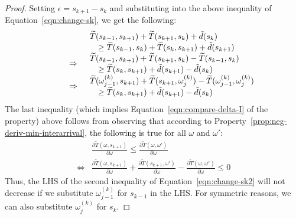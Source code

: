 \begin{proof}
\noindent Setting $\epsilon = s_{k+1} - s_k$ and substituting into the above inequality of Equation~\ref{eqn:change-sk}, we get the following:
\begin{equation}\label{eqn:change-sk2}
\begin{array}{ll}
     &\begin{array}{ll}
        \lefteqn{\widetilde{T}(s_{k-1},s_{k+1}) + \widetilde{T}(s_{k+1}, s_k) + \tilde{d}(s_k)}& \\
        &\geq \widetilde{T}(s_{k-1},s_k) + \widetilde{T}(s_k, s_{k+1}) + \tilde{d}(s_{k+1}) 
    \end{array}\\
    \Rightarrow&
    \begin{array}{ll}
        \lefteqn{\widetilde{T}(s_{k-1},s_{k+1}) + \widetilde{T}(s_{k+1}, s_k) - \widetilde{T}(s_{k-1},s_k)}& \\
        &\geq \widetilde{T}(s_k, s_{k+1}) + \tilde{d}(s_{k+1}) - \tilde{d}(s_k)
    \end{array}\\
    \Rightarrow&
    \begin{array}{ll}
        \lefteqn{\widetilde{T}(\omega^{(k)}_{j-1}, s_{k+1}) + \widetilde{T}(s_{k+1},\omega^{(k)}_{j}) - \widetilde{T}(\omega^{(k)}_{j-1},\omega^{(k)}_{j})} &\\
        &\geq \widetilde{T}(s_k, s_{k+1}) + \tilde{d}(s_{k+1}) - \tilde{d}(s_k) \\
    \end{array}\\
\end{array}
\end{equation}
\noindent The last inequality (which implies Equation~\ref{eqn:compare-delta-I} of the property) above follows from observing that according to Property~\ref{prop:neg-deriv-min-interarrival}, the following is true for all $\omega$ and $\omega'$:
\begin{equation}
\begin{array}{ll}
        &\frac{\partial \widetilde{T}(\omega,s_{k+1})}{\partial \omega}
            \leq \frac{\partial \widetilde{T}(\omega,\omega')}{\partial \omega} \nonumber\\
        \Leftrightarrow&
        \frac{\partial \widetilde{T}(\omega,s_{k+1})}{\partial \omega} + \frac{\partial \widetilde{T}(s_{k+1},\omega')}{\partial \omega} - \frac{\partial \widetilde{T}(\omega,\omega')}{\partial \omega} \leq 0 \nonumber  
\end{array}
\end{equation}
\noindent  Thus, the LHS of the second inequality of Equation~\ref{eqn:change-sk2} will not decrease if we substitute $\omega^{(k)}_{j-1}$ for $s_{k-1}$ in the LHS.  For symmetric reasons, we can also substitute $\omega^{(k)}_{j}$ for $s_k$.
\end{proof}

